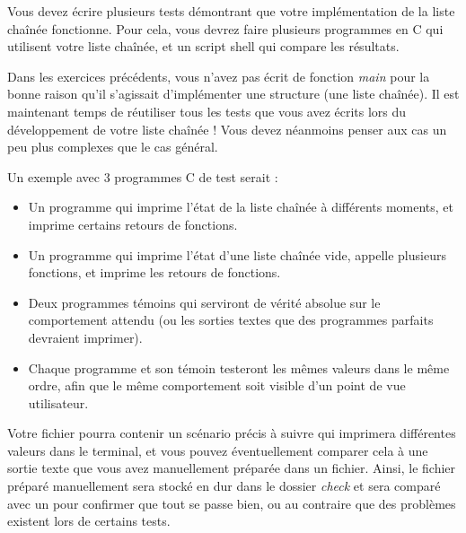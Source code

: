 

\vspace*{0.7cm}

\noindent {}

\bigskip

\noindent Vous devez écrire plusieurs tests démontrant que votre implémentation de la liste chaînée fonctionne.
Pour cela, vous devrez faire plusieurs programmes en C qui utilisent votre liste chaînée, et un script shell qui compare les résultats.

\noindent Dans les exercices précédents, vous n'avez pas écrit de fonction \textit{main} pour la bonne raison qu'il s'agissait d'implémenter une structure (une liste chaînée).
Il est maintenant temps de réutiliser tous les tests que vous avez écrits lors du développement de votre liste chaînée !
Vous devez néanmoins penser aux cas un peu plus complexes que le cas général.

\bigskip

\noindent Un exemple avec 3 programmes C de test serait :
\begin{itemize}
\item Un programme qui imprime l'état de la liste chaînée à différents moments, et imprime certains retours de fonctions.
\item Un programme qui imprime l'état d'une liste chaînée vide, appelle plusieurs fonctions, et imprime les retours de fonctions.
\item Deux programmes témoins qui serviront de vérité absolue sur le comportement attendu (ou les sorties textes que des programmes parfaits devraient imprimer).
\item Chaque programme et son témoin testeront les mêmes valeurs dans le même ordre, afin que le même comportement soit visible d'un point de vue utilisateur.
\end{itemize}

\bigskip

\noindent Votre fichier  pourra contenir un scénario précis à suivre qui imprimera différentes valeurs dans le terminal, et vous pouvez éventuellement comparer cela à une sortie texte que vous avez manuellement préparée dans un fichier.
Ainsi, le fichier préparé manuellement sera stocké en dur dans le dossier \textit{check} et sera comparé avec un  pour confirmer que tout se passe bien, ou au contraire que des problèmes existent lors de certains tests.

